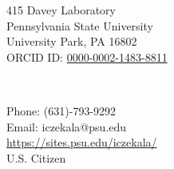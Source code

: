 \parbox[t]{3in}{
\begin{flushleft}
415 Davey Laboratory\\
Pennsylvania State University\\
University Park, PA 16802\\
ORCID ID: \href{http://orcid.org/0000-0002-1483-8811}{0000-0002-1483-8811} \\
\end{flushleft}} \ \hfill  \
\parbox[t]{3in}{
\begin{flushright}
Phone: (631)-793-9292\\
Email: iczekala@psu.edu\\
\url{https://sites.psu.edu/iczekala/}\\
U.S. Citizen
\end{flushright}}
